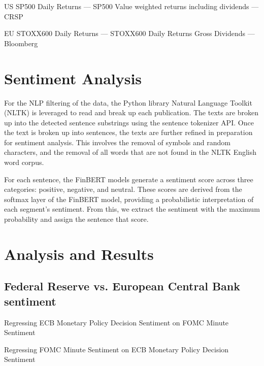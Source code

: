 \documentclass[12pt, letterpaper]{article}
\begin{document}
US SP500 Daily Returns — SP500 Value weighted returns including dividends — CRSP

EU STOXX600 Daily Returns — STOXX600 Daily Returns Gross Dividends — Bloomberg

\section{Sentiment Analysis}
For the NLP filtering of the data, the Python library Natural Language Toolkit (NLTK) is leveraged to read and break up each publication. The texts are broken up into the detected sentence substrings using the sentence tokenizer API. Once the text is broken up into sentences, the texts are further refined in preparation for sentiment analysis. This involves the removal of symbols and random characters, and the removal of all words that are not found in the NLTK English word corpus.  

For each sentence, the FinBERT models generate a sentiment score across three categories: positive, negative, and neutral. These scores are derived from the softmax layer of the FinBERT model, providing a probabilistic interpretation of each segment's sentiment. From this, we extract the sentiment with the maximum probability and assign the sentence that score.

\section{Analysis and Results}

\subsection{Federal Reserve vs. European Central Bank sentiment}

Regressing ECB Monetary Policy Decision Sentiment on FOMC Minute Sentiment


Regressing FOMC Minute Sentiment on ECB Monetary Policy Decision Sentiment
\end{document}
